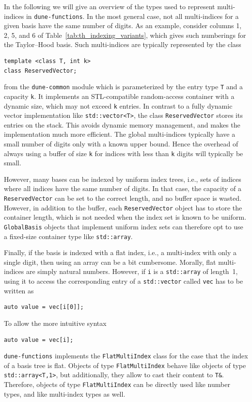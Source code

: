 \documentclass[a4paper,10pt,headings=normal,bibliography=totoc]{scrartcl}
\newcommand{\cpp}[1]{\lstinline[basicstyle=\ttfamily]!#1!}
\newcommand{\dunemodule}[1]{\texttt{#1}}
\begin{document}
In the following we will
give an overview of the types used to represent multi-indices
in \dunemodule{dune-functions}.
In the most general case, not all multi-indices for a given basis have
the same number of digits.  As an example, consider columns 1, 2, 5, and 6
of Table~\ref{tab:th_indexing_variants}, which gives such numberings for the Taylor--Hood basis.
Such multi-indices are typically represented
by the class
\begin{lstlisting}[style=Interface]
template <class T, int k>
class ReservedVector;
\end{lstlisting}
from the \dunemodule{dune-common} module which is parameterized
by the entry type \cpp{T} and a capacity \cpp{k}.
It implements an STL-compatible random-access container with a dynamic size,
which may not exceed \cpp{k} entries.
In contrast to a fully dynamic vector implementation
like \cpp{std::vector<T>}, the class \cpp{ReservedVector} stores its entries
on the stack.  This avoids dynamic memory management, and makes the
implementation much more efficient. The global multi-indices typically have
a small number of digits only with a known upper bound.
Hence the overhead of always using a buffer of size \cpp{k}
for indices with less than \cpp{k} digits will typically be small.

However, many bases can be indexed by uniform index trees, i.e., sets of indices where
all indices have the same number of digits.  In that case, the capacity of a
\cpp{ReservedVector} can be set to the correct length, and no buffer space is wasted.
However, in addition to the buffer, each \cpp{ReservedVector} object has to store
the container length, which is not needed when the index set is known to be uniform.
\cpp{GlobalBasis} objects that implement uniform index sets can therefore
opt to use a fixed-size container type like \cpp{std::array}.

Finally, if the basis is indexed with a flat index, i.e., a multi-index with only a single digit,
then using an array can be a bit cumbersome.  Morally, flat multi-indices
are simply natural numbers.  However, if \cpp{i} is a \cpp{std::array} of length~1,
using it to access the corresponding entry of a \cpp{std::vector} called \cpp{vec} has to be
written as
\begin{lstlisting}
auto value = vec[i[0]];
\end{lstlisting}
To allow the more intuitive syntax
\begin{lstlisting}
auto value = vec[i];
\end{lstlisting}
\dunemodule{dune-functions} implements the \cpp{FlatMultiIndex} class for the
case that the index
of a basis tree is flat.  Objects of type \cpp{FlatMultiIndex}
behave like objects of type \cpp{std::array<T,1>}, but additionally, they allow to cast
their content to \cpp{T&}.  Therefore, objects of type \cpp{FlatMultiIndex} can be directly used
like number types, and like multi-index types as well.
\end{document}
